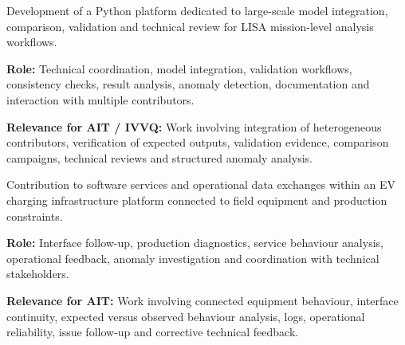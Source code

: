 \documentclass[8pt,a4paper,ragged2e,withhyper]{altacv}
\begin{document}


Development of a Python platform dedicated to large-scale model integration, comparison, validation and technical review for LISA mission-level analysis workflows.

\textbf{Role:} Technical coordination, model integration, validation workflows, consistency checks, result analysis, anomaly detection, documentation and interaction with multiple contributors.

\textbf{Relevance for AIT / IVVQ:} Work involving integration of heterogeneous contributors, verification of expected outputs, validation evidence, comparison campaigns, technical reviews and structured anomaly analysis.

\divider


Contribution to software services and operational data exchanges within an EV charging infrastructure platform connected to field equipment and production constraints.

\textbf{Role:} Interface follow-up, production diagnostics, service behaviour analysis, operational feedback, anomaly investigation and coordination with technical stakeholders.

\textbf{Relevance for AIT:} Work involving connected equipment behaviour, interface continuity, expected versus observed behaviour analysis, logs, operational reliability, issue follow-up and corrective technical feedback.


\vspace{-.3cm}


{\small
{}
}

\divider\smallskip
\vspace{-.3cm}
\end{document}
